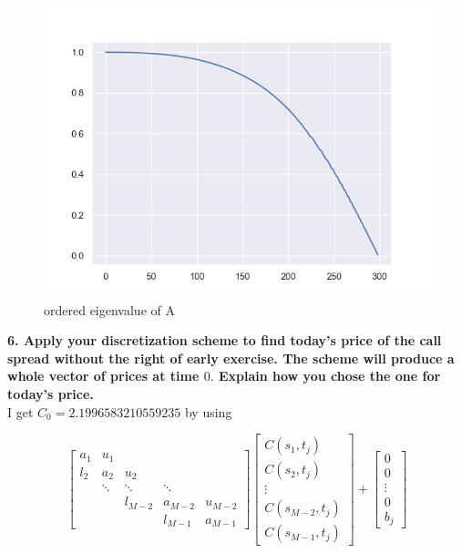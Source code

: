 \documentclass{winnower}
\begin{document}
\begin{figure}[!h]
\begin{center}
\includegraphics[scale=0.7]{1_2.jpg}
\caption
{ordered eigenvalue of A}
\label{fig:f1}
\end{center}
\end{figure}


\textbf{6. Apply your discretization scheme to find today's price of the call spread without the right of early exercise. The scheme will produce a whole vector of prices at time $0 .$ Explain how you chose the one for today's price.}
\\

I get $C_0=2.1996583210559235$ by using

$$\left[\begin{array}{ccccc}
a_{1} & u_{1} & & & \\
l_{2} & a_{2} & u_{2} & & \\
& \ddots & \ddots & \ddots & \\
& & l_{M-2} & a_{M-2} & u_{M-2} \\
& & & l_{M-1} & a_{M-1}
\end{array}\right]\left[\begin{array}{c}
C\left(s_{1}, t_{j}\right) \\
C\left(s_{2}, t_{j}\right) \\
\vdots \\
C\left(s_{M-2}, t_{j}\right) \\
C\left(s_{M-1}, t_{j}\right)
\end{array}\right]+\left[\begin{array}{c}
0 \\
0 \\
\vdots \\
0 \\
b_{j}
\end{array}\right]$$
\end{document}
